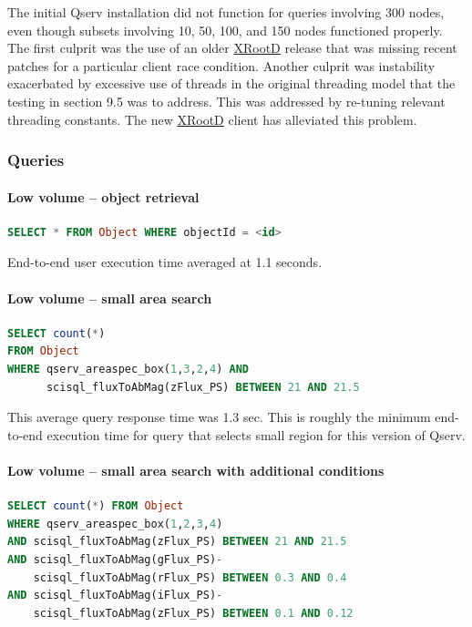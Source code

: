 \documentclass[DM,lsstdraft,toc]{lsstdoc}
\begin{document}
The initial Qserv installation did not function for queries involving
300 nodes, even though subsets involving 10, 50, 100, and 150 nodes
functioned properly. The first culprit was the use of an older
\href{http://xrootd.org}{XRootD} release that was missing recent patches
for a particular client race condition. Another culprit was instability
exacerbated by excessive use of threads in the original threading model
that the testing in section 9.5 was to address. This was addressed by
re-tuning relevant threading constants. The new
\href{http://xrootd.org}{XRootD} client has alleviated this problem.

\subsubsection{Queries}\label{queries-1}

\paragraph{Low volume -- object
retrieval}\label{low-volume-object-retrieval}

\begin{lstlisting}[language=SQL]
SELECT * FROM Object WHERE objectId = <id>
\end{lstlisting}

End-to-end user execution time averaged at 1.1 seconds.

\paragraph{Low volume -- small area
search}\label{low-volume-small-area-search}

\begin{lstlisting}[language=SQL]
SELECT count(*)
FROM Object
WHERE qserv_areaspec_box(1,3,2,4) AND
      scisql_fluxToAbMag(zFlux_PS) BETWEEN 21 AND 21.5
\end{lstlisting}

This average query response time was 1.3 sec. This is roughly the
minimum end-to-end execution time for query that selects small region
for this version of Qserv.

\paragraph{Low volume -- small area search with additional
conditions}\label{low-volume-small-area-search-with-additional-conditions}

\begin{lstlisting}[language=SQL]
SELECT count(*) FROM Object
WHERE qserv_areaspec_box(1,2,3,4)
AND scisql_fluxToAbMag(zFlux_PS) BETWEEN 21 AND 21.5
AND scisql_fluxToAbMag(gFlux_PS)-
    scisql_fluxToAbMag(rFlux_PS) BETWEEN 0.3 AND 0.4
AND scisql_fluxToAbMag(iFlux_PS)-
    scisql_fluxToAbMag(zFlux_PS) BETWEEN 0.1 AND 0.12
\end{lstlisting}
\end{document}
